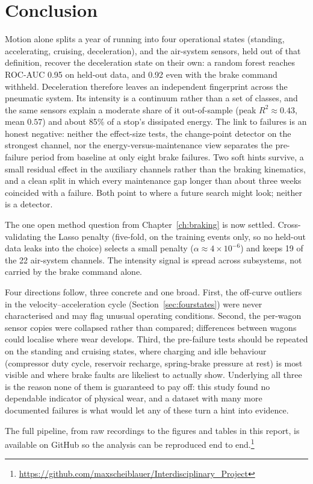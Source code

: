 \chapter{Conclusion}
\label{ch:conclusion}

Motion alone splits a year of running into four operational states (standing, accelerating,
cruising, deceleration), and the air-system sensors, held out of that definition, recover the
deceleration state on their own: a random forest reaches ROC-AUC 0.95 on held-out data, and
0.92 even with the brake command withheld. Deceleration therefore leaves an independent
fingerprint across the pneumatic system. Its intensity is a continuum rather than a set of
classes, and the same sensors explain a moderate share of it out-of-sample (peak $R^2 \approx
0.43$, mean $0.57$) and about 85\% of a stop's dissipated energy. The link to failures is an
honest negative: neither the effect-size tests, the change-point detector on the strongest
channel, nor the energy-versus-maintenance view separates the pre-failure period from baseline
at only eight brake failures. Two soft hints survive, a small residual effect in the auxiliary
channels rather than the braking kinematics, and a clean split in which every maintenance gap
longer than about three weeks coincided with a failure. Both point to where a future search
might look; neither is a detector.

The one open method question from Chapter~\ref{ch:braking} is now settled. Cross-validating
the Lasso penalty (five-fold, on the training events only, so no held-out data leaks into the
choice) selects a small penalty ($\alpha \approx 4\times10^{-6}$) and keeps 19 of the 22
air-system channels. The intensity signal is spread across subsystems, not carried by the
brake command alone.

Four directions follow, three concrete and one broad. First, the off-curve outliers in the
velocity--acceleration cycle (Section~\ref{sec:fourstates}) were never characterised and may
flag unusual operating conditions. Second, the per-wagon sensor copies were collapsed rather
than compared; differences between wagons could localise where wear develops. Third, the
pre-failure tests should be repeated on the standing and cruising states, where charging and
idle behaviour (compressor duty cycle, reservoir recharge, spring-brake pressure at rest) is
most visible and where brake faults are likeliest to actually show. Underlying all three is
the reason none of them is guaranteed to pay off: this study found no dependable indicator of
physical wear, and a dataset with many more documented failures is what would let any of these
turn a hint into evidence.

The full pipeline, from raw recordings to the figures and tables in this report, is available
on GitHub so the analysis can be reproduced end to end.\footnote{\url{https://github.com/maxscheiblauer/Interdisciplinary_Project}}
